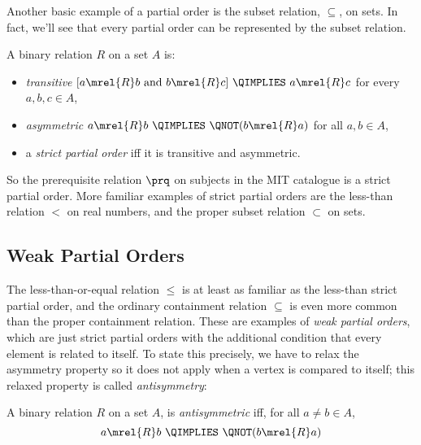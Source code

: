 Another basic example of a partial order is the subset relation,
$\subseteq$, on sets.  In fact, we'll see that every partial order can be
represented by the subset relation.

\begin{definition}
A binary relation $R$ on a set $A$ is:
\begin{itemize}

\item \emph{transitive} \qiff 
$[a \mrel{R}  b \text{ and } b \mrel{R}  c]\ \QIMPLIES\  a \mrel{R}  c$
\quad for every $a,b,c\in A$,

\item \emph{asymmetric} \qiff
$a \mrel{R}  b\  \QIMPLIES\  \QNOT(b \mrel{R}  a)$
\quad for all $a,b\in A$,

\item a \emph{strict partial order} iff it is transitive and asymmetric.
\end{itemize}

\end{definition}

So the prerequisite relation $\prq$ on subjects in the MIT catalogue is
a strict partial order.  More familiar examples of strict partial orders
are the less-than relation $<$ on real numbers, and the proper subset relation
$\subset$ on sets.
\fi

\subsection{Weak Partial Orders}
The less-than-or-equal relation $\leq$ is at least as familiar as
the less-than strict partial order, and the ordinary containment
relation $\subseteq$ is even more common than the proper containment
relation.  These are examples of \emph{weak partial orders},%
which are just strict partial orders with the additional condition that every
element is related to itself.  To state this precisely, we have to
relax the asymmetry property so it does not apply when a vertex is
compared to itself; this relaxed property%
 is called
\emph{antisymmetry}:

\begin{definition}\label{antis}
A binary relation $R$ on a set $A$, is \emph{antisymmetric}%
iff, for all $a \neq b \in A$,
\[
a \mrel{R}  b\ \QIMPLIES\ \QNOT(b \mrel{R}  a)
\]
\end{definition}

